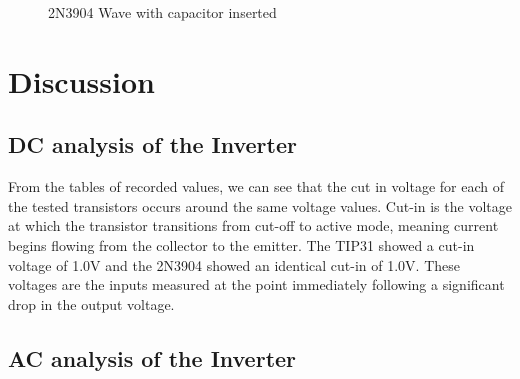 \documentclass[10pt]{article}
\begin{document}
		\begin{figure}[H]
			\caption{2N3904 Wave with capacitor inserted}
			\label{fig:2N-4}
		\end{figure}

\section{Discussion}

\subsection{DC analysis of the Inverter}

From the tables of recorded values, we can see that the cut in voltage for
each of the tested transistors occurs around the same voltage values.
Cut-in is the voltage at which the transistor transitions from cut-off to
active mode, meaning current begins flowing from the collector to the
emitter. The TIP31 showed a cut-in voltage of 1.0V and the 2N3904 showed
an identical cut-in of 1.0V. These voltages are the inputs measured at the
point immediately following a significant drop in the output voltage.

\subsection{AC analysis of the Inverter}
\end{document}
